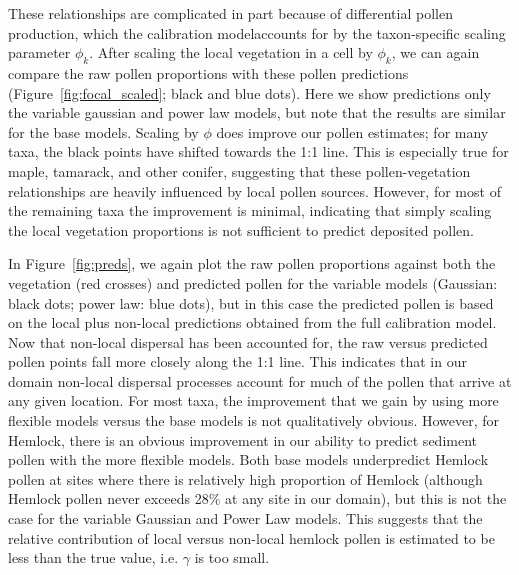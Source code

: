 \documentclass[12pt]{article}
\begin{document}
These relationships are complicated in part because of differential
pollen production, which the calibration modelaccounts for by the
taxon-specific scaling parameter $\phi_k$. After scaling the local
vegetation in a cell by $\phi_k$, we can again compare the raw pollen
proportions with these pollen predictions
(Figure~\ref{fig:focal_scaled}; black and blue dots). Here we show
predictions only the variable gaussian and power law models, but note
that the results are similar for the base models. Scaling by $\phi$
does improve our pollen estimates; for many taxa, the black points
have shifted towards the 1:1 line. This is especially true for maple,
tamarack, and other conifer, suggesting that these pollen-vegetation
relationships are heavily influenced by local pollen sources. However,
for most of the remaining taxa the improvement is minimal, indicating
that simply scaling the local vegetation proportions is not sufficient
to predict deposited pollen.

In Figure~\ref{fig:preds}, we again plot the raw pollen proportions
against both the vegetation (red crosses) and predicted pollen for the
variable models (Gaussian: black dots; power law: blue dots), but in
this case the predicted pollen is based on the local plus non-local
predictions obtained from the full calibration model. Now that
non-local dispersal has been accounted for, the raw versus predicted
pollen points fall more closely along the 1:1 line. This indicates
that in our domain non-local dispersal processes account for much of
the pollen that arrive at any given location. For most taxa, the
improvement that we gain by using more flexible models versus the base
models is not qualitatively obvious. However, for Hemlock, there is an
obvious improvement in our ability to predict sediment pollen with the
more flexible models. Both base models underpredict Hemlock pollen at
sites where there is relatively high proportion of Hemlock (although
Hemlock pollen never exceeds 28\% at any site in our domain), but this
is not the case for the variable Gaussian and Power Law models. This
suggests that the relative contribution of local versus non-local
hemlock pollen is estimated to be less than the true value,
i.e. $\gamma$ is too small.
\end{document}
